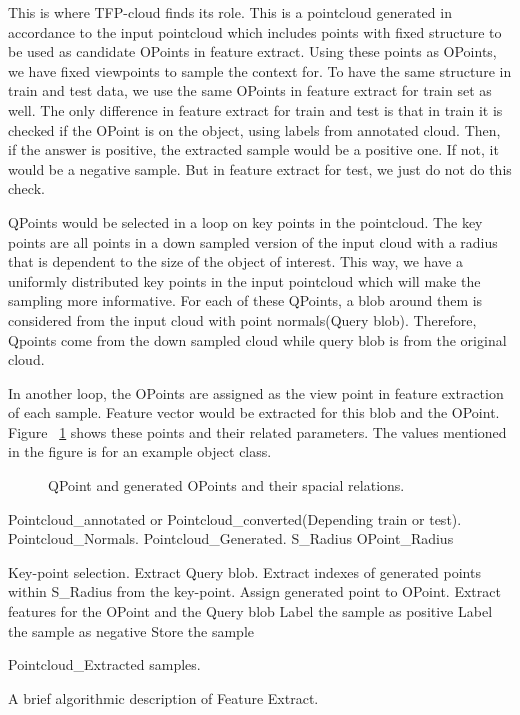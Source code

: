 This is where TFP-cloud finds its role.
This is a pointcloud generated in accordance to the input pointcloud which includes points with fixed structure to be used as 
candidate OPoints in feature extract.
Using these points as OPoints, we have fixed viewpoints to sample the context for. 
To have the same structure in train and test data, we use the same OPoints in feature extract for train set as well.
The only difference in feature extract for train and test is that in train it is checked if the OPoint is on the object, using 
labels from annotated cloud. 
Then, if the answer is positive, the extracted sample would be a positive one. 
If not, it would be a negative sample. 
But in feature extract for test, we just do not do this check.

QPoints would be selected in a loop on key points in the pointcloud. 
The key points are all points in a down sampled version of the input cloud with a radius that is dependent to the 
size of the object of interest. 
This way, we have a uniformly distributed key points in the input pointcloud which will make the sampling more informative.
For each of these QPoints, a blob around them is considered from the input cloud with point normals(Query blob).
Therefore, Qpoints come from the down sampled cloud while query blob is from the original cloud.

In another loop, the OPoints are assigned  as the view point in feature extraction of each sample. 
Feature vector would be extracted for this blob and the OPoint. 
Figure ~\ref{PointParameters_Diagram.figure} shows these points and their related parameters. 
The values mentioned in the figure is for an example object class.

\begin{figure}[t]
  \caption[Feature extract structure]
  {QPoint and generated OPoints and their spacial relations.}
  \label{PointParameters_Diagram.figure}
\end{figure}

\begin{algorithm}[t]
\begin{algorithmic}[1]
\REQUIRE Pointcloud\_annotated or Pointcloud\_converted(Depending train or test).
\REQUIRE Pointcloud\_Normals.
\REQUIRE Pointcloud\_Generated.
\REQUIRE S\_Radius
\REQUIRE OPoint\_Radius
\medskip

\STATE Key-point selection.
  \STATE Extract Query blob.
  \STATE Extract indexes of generated points within S\_Radius from the key-point.
    \STATE Assign generated point to OPoint.
    \STATE Extract features for the OPoint and the Query blob
	\STATE Label the sample as positive
      \ELSE
	\STATE Label the sample as negative
      \ENDIF
     \ENDIF
   \ENDFOR
     \STATE Store the sample
\ENDFOR

\medskip
\ENSURE Pointcloud\_Extracted samples.
\end{algorithmic}
\caption[Feature Extract.]
{A brief algorithmic description of Feature Extract.}
\label{FeatureEXtract.algorithm}
\end{algorithm}

